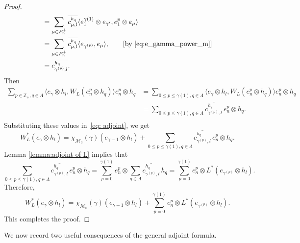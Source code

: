 \documentclass[12pt]{amsart}
\theoremstyle{definition}
\theoremstyle{remark}
\def \Z{\mathbb{Z}}
\newcommand{\clm}{\mathcal{M}}
\newcommand{\ol}{\overline}
\numberwithin{equation}{section}
\begin{document}
\begin{proof}
\begin{align*}
&=\sum_{\mu \in F_n^+ } \ol{c^{h_q}_{\mu,l} } \langle e_1^{\gamma(1)} \otimes e_{\gamma'},  e_1^{ p} \otimes  e_{\mu} \rangle\\
&=\sum_{\mu \in F_n^+ } \ol{c^{h_q}_{\mu,l} } \langle e_{\gamma^{(p)}},    e_{\mu} \rangle,\qquad [\text{by }\eqref{eq:e_gamma_power_m}]\\
&= \ol{c^{h_q}_{\gamma^{(p)},l} }.    
\end{align*}
Then
\begin{align*}
 \sum_{p \in \Z_+ , q \in \Lambda} \langle e_\gamma \otimes h_l,  W_L(e_{n}^p \otimes {h_q}) \rangle e_{n}^p \otimes {h_q} 
&=  \sum_{0 \leq p \leq \gamma(1), q \in \Lambda} \langle e_\gamma \otimes h_l,  W_L(e_{n}^p \otimes {h_q}) \rangle e_{n}^p \otimes {h_q}\\
&= \sum_{0 \leq p \leq \gamma(1), q \in \Lambda}  \ol{c^{h_q}_{\gamma^{(p)},l} }\,e_{n}^p \otimes {h_q}.\\
\end{align*}
Substituting these values in~\eqref{eq: adjoint}, we get
\begin{equation*} 
   W_L^*(e_\gamma \otimes h_l)
= \chi_{\clm_0}(\gamma )(e_{\gamma-1} \otimes h_l) +\sum_{0 \leq p \leq \gamma(1), q \in \Lambda}  \ol{c^{h_q}_{\gamma^{(p)},l} }\,e_{n}^p \otimes {h_q}.
\end{equation*}
Lemma \ref{lemma:adjoint of L} implies that
\[
\sum_{0 \leq p \leq \gamma(1), q \in \Lambda}  \ol{c^{h_q}_{\gamma^{(p)},l} }\,e_{n}^p \otimes {h_q}=\sum^{\gamma(1)}_{p=0} e_{n}^p \otimes   \sum_{q \in \Lambda}  \ol{c^{h_q}_{\gamma^{(p)},l} }\,{h_q}= \sum^{\gamma(1)}_{p=0} e_n^p \otimes L^*(e_{\gamma^{(p)}}\otimes h_l).
\]
Therefore, 
\begin{equation*} 
   W_L^*(e_\gamma \otimes h_l)
= \chi_{\clm_0}(\gamma )(e_{\gamma-1} \otimes h_l) +\sum^{\gamma(1)}_{p=0}  e_{n}^p \otimes L^*(e_{\gamma^{(p)}}\otimes h_l).
\end{equation*}
This completes the proof.
\end{proof}


We now record two useful consequences of the general adjoint formula.
\end{document}
